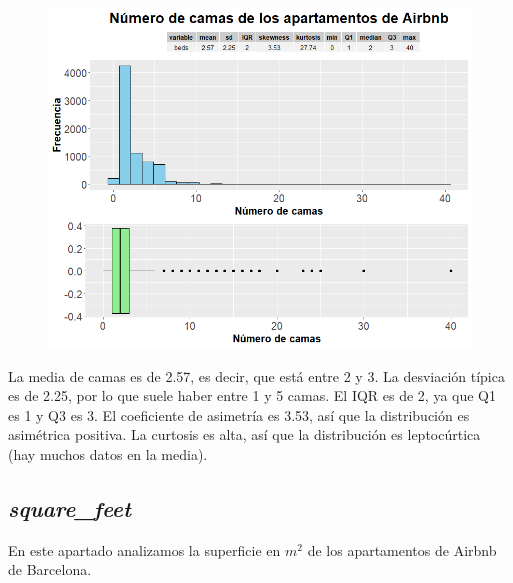 \documentclass{article}
\begin{document}
\vspace{0.35cm}
\begin{figure}[h]
\hspace*{-0.15cm}
\centering
\includegraphics[scale = 0.6]{grafico_beds}
\end{figure}
\vspace{0.15cm}

La media de camas es de 2.57, es decir, que está entre 2 y 3.
La desviación típica es de 2.25, por lo que suele haber entre 1 y 5 camas.
El IQR es de 2, ya que Q1 es 1 y Q3 es 3.
El coeficiente de asimetría es 3.53, así que la distribución es asimétrica positiva.
La curtosis es alta, así que la distribución es leptocúrtica (hay muchos datos en la media).

\clearpage
\subsection{\emph{square\_feet}}
En este apartado analizamos la superficie en $m^{2}$ de los apartamentos de Airbnb de Barcelona.
\end{document}
